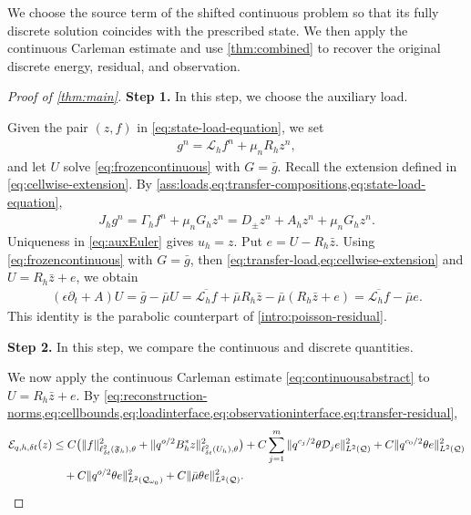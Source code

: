 \documentclass[print,wide,eng]{draft}
\begin{document}
We choose the source term of the shifted continuous problem so that its fully discrete solution coincides with the prescribed state. We then apply the continuous Carleman estimate and use \cref{thm:combined} to recover the original discrete energy, residual, and observation.
%
\begin{proof}[Proof of \cref{thm:main}]
{\bf Step 1.} In this step, we choose the auxiliary load.

Given the pair $(z,f)$ in \cref{eq:state-load-equation}, we set\vspace{-2mm}
%
\begin{align}\label{eq:transfer-load}
g^n=\mathcal L_hf^n+\mu_nR_hz^n,
\end{align}
%
and let $U$ solve \cref{eq:frozencontinuous} with $G=\bar g$.
Recall the extension defined in \cref{eq:cellwise-extension}.
By \cref{ass:loads,eq:transfer-compositions,eq:state-load-equation},\vspace{-2mm}
%
\begin{align*}
J_hg^n=\Gamma_hf^n+\mu_nG_hz^n
=D_\pm z^n+A_hz^n+\mu_nG_hz^n.
\end{align*}
%
Uniqueness in \cref{eq:auxEuler} gives $u_h=z$. Put $e=U-R_h\bar z$.
Using \cref{eq:frozencontinuous} with $G=\bar g$, then \cref{eq:transfer-load,eq:cellwise-extension} and $U=R_h\bar z+e$, we obtain\vspace{-2mm}
%
\begin{align}\label{eq:transfer-residual}
(\epsilon\partial_t+A)U
=\bar g-\bar\mu U
=\overline{\mathcal L_hf}+\bar\mu R_h\bar z-\bar\mu(R_h\bar z+e)
=\overline{\mathcal L_hf}-\bar\mu e.
\end{align}
%
This identity is the parabolic counterpart of \cref{intro:poisson-residual}.

{\bf Step 2.} In this step, we compare the continuous and discrete quantities.

We now apply the continuous Carleman estimate \cref{eq:continuousabstract} to $U=R_h\bar z+e$. By \cref{eq:reconstruction-norms,eq:cellbounds,eq:loadinterface,eq:observationinterface,eq:transfer-residual},\vspace{-2mm}
%
\begin{align}\label{eq:transfer-comparison}
\mathcal E_{q,h,{\delta t}}(z)&\leq C\bigl(\|f\|_{\ell_{\delta t}^2(\mathfrak F_h),\theta}^2
+\|q^{o/2}B_h^*z\|_{\ell_{\delta t}^2(U_h),\theta}^2\bigr)
+C\sum_{j=1}^m\|q^{c_j/2}\theta\mathcal D_je\|_{L^2(\mathcal Q)}^2
+C\|q^{c_0/2}\theta e\|_{L^2(\mathcal Q)}^2
\notag\\
&\quad
+C\|q^{o/2}\theta e\|_{L^2(\mathcal Q_{\omega_0})}^2
+C\|\bar\mu\theta e\|_{L^2(\mathcal Q)}^2.
\end{align}
%


\end{proof}
\end{document}
